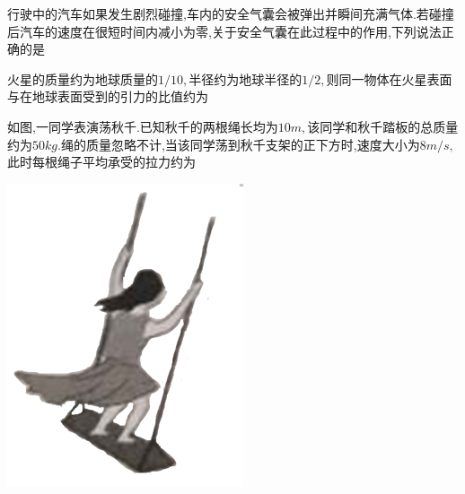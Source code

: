 \question[6]行驶中的汽车如果发生剧烈碰撞,车内的安全气囊会被弹出并瞬间充满气体.若碰撞后汽车的速度在很短时间内减小为零,关于安全气囊在此过程中的作用,下列说法正确的是
\begin{solution}{4cm}

\end{solution}



\question[6]火星的质量约为地球质量的$1/10,$半径约为地球半径的$1/2,$则同一物体在火星表面与在地球表面受到的引力的比值约为
\begin{solution}{4cm}

\end{solution}



\question[6]如图,一同学表演荡秋千.已知秋千的两根绳长均为$10m,$该同学和秋千踏板的总质量约为$50kg.$绳的质量忽略不计,当该同学荡到秋千支架的正下方时,速度大小为$8m/s,$此时每根绳子平均承受的拉力约为
\begin{center}
\includegraphics[]{img/image1.png}
\end{center}

\begin{solution}{4cm}

\end{solution}


